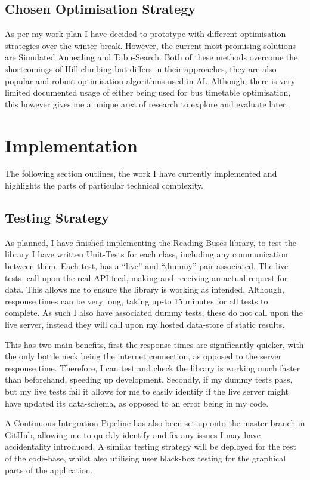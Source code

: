 \documentclass{article}
\begin{document}
\subsection{Chosen Optimisation Strategy}
As per my work-plan I have decided to prototype with different optimisation strategies over the winter break. However, the current most promising solutions are Simulated Annealing and Tabu-Search. Both of these methods overcome the shortcomings of Hill-climbing but differs in their approaches, they are also popular and robust optimisation algorithms used in AI. Although, there is very limited documented usage of either being used for bus timetable optimisation, this however gives me a unique area of research to explore and evaluate later.


\section{Implementation}
The following section outlines, the work I have currently implemented and highlights the parts of particular technical complexity.


\subsection{Testing Strategy}
As planned, I have finished implementing the Reading Buses library, to test the library I have written Unit-Tests for each class, including any communication between them. Each test, has a ``live'' and ``dummy'' pair associated. The live tests, call upon the real API feed, making and receiving an actual request for data. This allows me to ensure the library is working as intended. Although, response times can be very long, taking up-to 15 minutes for all tests to complete. As such I also have associated dummy tests, these do not call upon the live server, instead they will call upon my hosted data-store of static results.

\par 
This has two main benefits, first the response times are significantly quicker, with the only bottle neck being the internet connection, as opposed to the server response time. Therefore, I can test and check the library is working much faster than beforehand, speeding up development. Secondly, if my dummy tests pass, but my live tests fail it allows for me to easily identify if the live server might have updated its data-schema, as opposed to an error being in my code. 

\par
A Continuous Integration Pipeline has also been set-up onto the master branch in GitHub, allowing me to quickly identify and fix any issues I may have accidentality introduced. A similar testing strategy will be deployed for the rest of the code-base, whilst also utilising user black-box testing for the graphical parts of the application.
\end{document}
